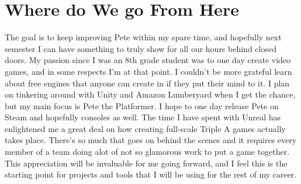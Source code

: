 \documentclass[]{article}
\begin{document}
\section{Where do We go From Here}
	The goal is to keep improving Pete within my spare time, and hopefully next semester I can have something to truly show for all our hours behind closed doors. My passion since I was an 8th grade student was to one day create video games, and in some respects I'm at that point. I couldn't be more grateful learn about free engines that anyone can create in if they put their mind to it. I plan on tinkering around with Unity and Amazon Lumberyard when I get the chance, but my main focus is Pete the Platformer. I hope to one day release Pete on Steam and hopefully consoles as well. The time I have spent with Unreal has enlightened me a great deal on how creating full-scale Triple A games actually takes place. There's so much that goes on behind the scenes and it requires every member of a team doing alot of not so glamorous work to put a game together. This appreciation will be invaluable for me going forward, and I feel this is the starting point for projects and tools that I will be using for the rest of my career. 
\end{document}
